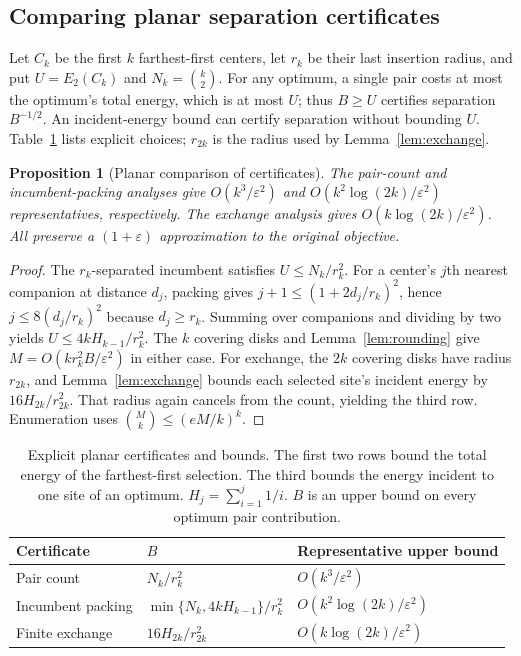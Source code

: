 \documentclass[a4paper,12pt]{article}
\newtheorem{proposition}[theorem]{Proposition}
\numberwithin{equation}{section}
\begin{document}
\subsection{Comparing planar separation certificates}\label{sec:comparison}
Let $C_k$ be the first $k$ farthest-first centers, let $r_k$ be their last insertion radius, and
put $U=E_2(C_k)$ and $N_k=\binom{k}{2}$. For any optimum, a single pair costs at most the optimum's total energy, which is at most $U$;
thus $B\ge U$ certifies separation $B^{-1/2}$. An incident-energy bound can certify separation
without bounding $U$.
Table~\ref{tab:comparison} lists explicit choices; $r_{2k}$ is the radius used by
Lemma~\ref{lem:exchange}.
\begin{proposition}[Planar comparison of certificates]\label{prop:comparison}
The pair-count and incumbent-packing analyses give $O(k^3/\varepsilon^2)$ and
$O(k^2\log(2k)/\varepsilon^2)$ representatives, respectively. The exchange analysis gives
$O(k\log(2k)/\varepsilon^2)$. All preserve a $(1+\varepsilon)$ approximation to the original
objective.
\end{proposition}
\begin{proof}
The $r_k$-separated incumbent satisfies $U\le N_k/r_k^2$. For a center's $j$th nearest companion
at distance $d_j$, packing gives $j+1\le(1+2d_j/r_k)^2$, hence $j\le8(d_j/r_k)^2$ because $d_j\ge
r_k$. Summing over companions and dividing by two yields $U\le4kH_{k-1}/r_k^2$. The $k$ covering
disks and Lemma~\ref{lem:rounding} give $M=O(k r_k^2 B/\varepsilon^2)$ in either case.
For exchange, the $2k$ covering disks have radius $r_{2k}$, and
Lemma~\ref{lem:exchange} bounds each selected site's incident energy by $16H_{2k}/r_{2k}^2$.
That radius again cancels from the count, yielding the third row. Enumeration
uses $\binom Mk\le(eM/k)^k$.
\end{proof}
\begin{table}[t]\centering\small
\caption{Explicit planar certificates and bounds. The first two rows bound the total energy of the farthest-first selection. The third bounds the energy incident to one site of an optimum. $H_j=\sum_{i=1}^j1/i$. $B$ is an upper bound on every optimum pair contribution.}\label{tab:comparison}
\begin{tabular}{@{}lll@{}}\toprule
Certificate & $B$ & Representative upper bound\\\midrule
Pair count & $N_k/r_k^2$ & $O(k^3/\varepsilon^2)$\\
Incumbent packing & $\min\{N_k,4kH_{k-1}\}/r_k^2$ & $O(k^2\log(2k)/\varepsilon^2)$\\
Finite exchange & $16H_{2k}/r_{2k}^2$ & $O(k\log(2k)/\varepsilon^2)$\\\bottomrule
\end{tabular}\end{table}
\end{document}
